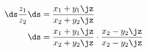 \begin{align}
\ds \frac{z_1}{z_2} & \ds = \frac{x_1 + y_1 \jz}{x_2 + y_2 \jz} \\
                    & \ds = \frac{x_1 + y_1 \jz}{x_2 + y_2 \jz} \cdot \frac{x_2
                - y_2 \jz}{x_2 - y_2 \jz}
\end{align}
